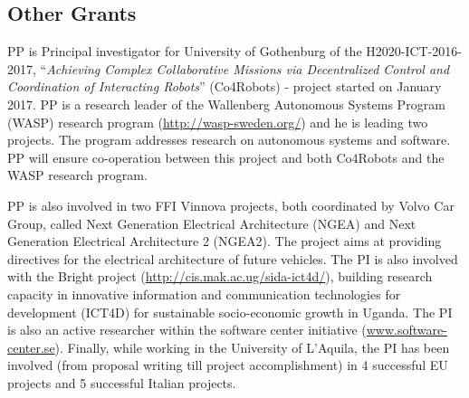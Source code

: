 \documentclass[12pt]{article}
\newcommand{\nb}[2]{
    \fcolorbox{gray}{yellow}{\bfseries\sffamily\scriptsize#1}
    {\sf\small$\blacktriangleright$\textit{#2}$\blacktriangleleft$}
   }
\newcommand{\nb}[2]{}
\newcommand\patrizio[1]{\nb{Patrizio}{#1}}
\begin{document}
\vspace{-.1cm}

\subsection{Other Grants}
PP is Principal investigator for University of Gothenburg of the H2020-ICT-2016-2017, ``{\em Achieving Complex Collaborative Missions via Decentralized Control and Coordination of Interacting Robots}'' (Co4Robots) - project started on January 2017. 
PP is a research leader of the Wallenberg Autonomous Systems Program (WASP) research program ({\small \url{http://wasp-sweden.org/}}) and he is leading two projects. The program addresses research on autonomous systems and software. %
PP will ensure co-operation between this project and both Co4Robots and the WASP research program.

PP is also involved in two FFI Vinnova projects, both coordinated by Volvo Car Group, called Next Generation Electrical Architecture (NGEA) and Next Generation Electrical Architecture 2 (NGEA2). The project aims at providing directives for the electrical architecture of future vehicles. 
The PI is also involved with the Bright project ({\small \url{http://cis.mak.ac.ug/sida-ict4d/}}), building research capacity in innovative information and communication technologies for development (ICT4D) for sustainable socio-economic growth in Uganda. 
The PI is also an active researcher within the software center initiative ({\small \url{www.software-center.se}}).
Finally, while working in the University of L'Aquila, the PI has been involved (from proposal writing till project accomplishment) in 4 successful EU projects and 5 successful Italian projects. %

\end{document}
